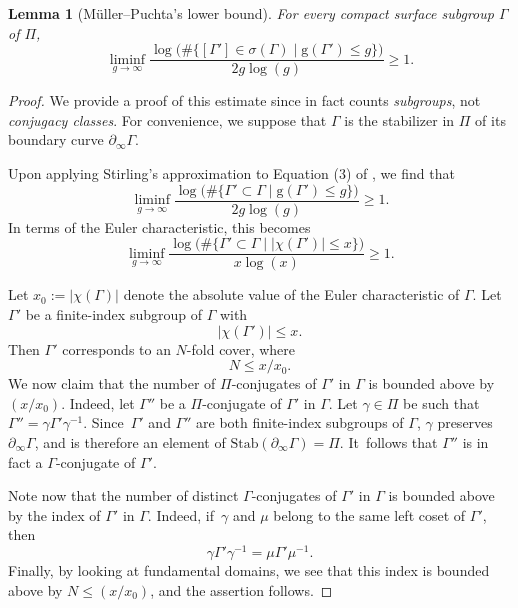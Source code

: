 \documentclass[11pt]{article}
\theoremstyle{plain}
\newtheorem{lemma}[theorem]{Lemma}
\theoremstyle{definition}
\begin{document}
\begin{lemma}[Müller--Puchta's lower bound]\label{l.Muller_Puchta}
For every compact surface subgroup $\Gamma$ of $\Pi$,
\begin{equation}\label{eq.lower_bound_MP}
\liminf_{g\to\infty}\frac{\log\bigl(\#\{[\Gamma']\in\sigma(\Gamma)\mid \mathrm{g}(\Gamma')\leq g\}\bigr)}{2g\log(g)} \geq 1.
\end{equation}
\end{lemma}

\begin{proof}
We provide a proof of this estimate since \cite{Muller_Puchta} in fact counts \emph{subgroups}, not \emph{conjugacy classes}. For convenience, we suppose that $\Gamma$ is the stabilizer in $\Pi$ of its boundary curve $\partial_\infty\Gamma$.

Upon applying Stirling's approximation to Equation (3) of \cite{Muller_Puchta}, we find that
\begin{equation*}
\liminf_{g\to\infty}\frac{\log\bigl(\#\{\Gamma'\subset\Gamma\mid \mathrm{g}(\Gamma')\leq g\}\bigr)}{2g\log(g)} \geq 1.
\end{equation*}
In terms of the Euler characteristic, this becomes
\begin{equation*}
\liminf_{g\to\infty}\frac{\log\bigl(\#\{\Gamma'\subset\Gamma\mid \left|\chi(\Gamma')\right|\leq x\}\bigr)}{x\log(x)} \geq 1.
\end{equation*}

Let $x_0:=\left|\chi(\Gamma)\right|$ denote the absolute value of the Euler characteristic of $\Gamma$. Let $\Gamma'$ be a finite-index subgroup of $\Gamma$ with
\begin{equation*}
\left|\chi(\Gamma')\right| \leq x.
\end{equation*}
Then $\Gamma'$ corresponds to an $N$-fold cover, where
\begin{equation*}
N\leq x/x_0.
\end{equation*}
We now claim that the number of $\Pi$-conjugates of $\Gamma'$ in $\Gamma$ is bounded above by $(x/x_0)$. Indeed, let $\Gamma''$ be a $\Pi$-conjugate of $\Gamma'$ in $\Gamma$. Let $\gamma\in\Pi$ be such that $\Gamma''=\gamma\Gamma'\gamma^{-1}$. Since~$\Gamma'$ and $\Gamma''$ are both finite-index subgroups of $\Gamma$, $\gamma$ preserves $\partial_\infty\Gamma$, and is therefore an element of $\mathrm{Stab}(\partial_\infty\Gamma)=\Pi$. It~follows that $\Gamma''$ is in fact a $\Gamma$-conjugate of $\Gamma'$.

Note now that the number of distinct $\Gamma$-conjugates of $\Gamma'$ in $\Gamma$ is bounded above by the index of $\Gamma'$ in $\Gamma$. Indeed, if~$\gamma$ and $\mu$ belong to the same left coset of $\Gamma'$, then
\begin{equation*}
\gamma\Gamma'\gamma^{-1} = \mu\Gamma'\mu^{-1}.
\end{equation*}
Finally, by looking at fundamental domains, we see that this index is bounded above by $N\leq (x/x_0)$, and the assertion follows.


\end{proof}
\end{document}
